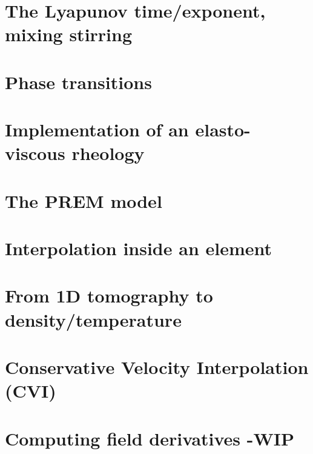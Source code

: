 \section{The Lyapunov time/exponent, mixing stirring}\label{ss:lyapunov} %
\newpage %
\section{Phase transitions}\label{ss:phasetransitions} %
\newpage %
\section{Implementation of an elasto-viscous rheology} \label{ss:evrheo}  %
\newpage %
\section{The PREM model} \label{ss:prem}  %
\newpage %
\section{Interpolation inside an element} \label{ss:bern}  %
\newpage %
\section{From 1D tomography to density/temperature}  %
\newpage %
\section{Conservative Velocity Interpolation (CVI)} \label{sec:cvi} %
\newpage %
\section{Computing field derivatives -WIP} \label{ss:nodderiv}  %
\newpage %
